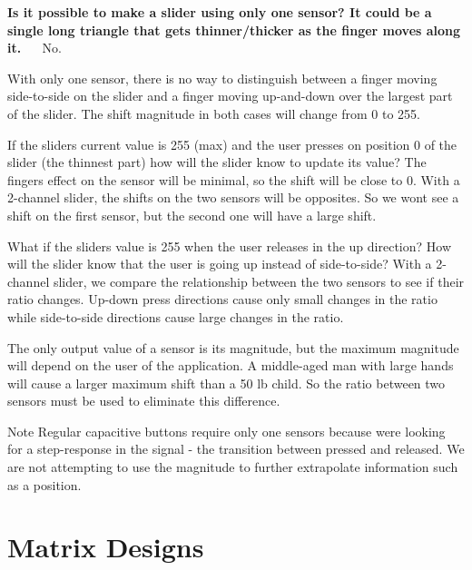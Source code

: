 \begin{DoxyItemize}
\item {\bfseries Is it possible to make a slider using only one sensor? It could be a single long triangle that gets thinner/thicker as the finger moves along it.}~\newline
~\newline
 No. 
\begin{DoxyItemize}
\item With only one sensor, there is no way to distinguish between a finger moving side-\/to-\/side on the slider and a finger moving up-\/and-\/down over the largest part of the slider. The shift magnitude in both cases will change from 0 to 255. 
\item If the slider\textquotesingle{}s current value is 255 (max) and the user presses on position 0 of the slider (the thinnest part) how will the slider know to update its value? The finger\textquotesingle{}s effect on the sensor will be minimal, so the shift will be close to 0. With a 2-\/channel slider, the shifts on the two sensors will be opposites. So we won\textquotesingle{}t see a shift on the first sensor, but the second one will have a large shift. 
\item What if the slider\textquotesingle{}s value is 255 when the user releases in the \textquotesingle{}up\textquotesingle{} direction? How will the slider know that the user is going up instead of side-\/to-\/side? With a 2-\/channel slider, we compare the relationship between the two sensors to see if their ratio changes. Up-\/down press directions cause only small changes in the ratio while side-\/to-\/side directions cause large changes in the ratio. 
\item The only output value of a sensor is its magnitude, but the maximum magnitude will depend on the user of the application. A middle-\/aged man with large hands will cause a larger maximum shift than a 50 lb child. So the ratio between two sensors must be used to eliminate this difference. 
\end{DoxyItemize}\begin{DoxyNote}{Note}
Regular capacitive buttons require only one sensors because we\textquotesingle{}re looking for a step-\/response in the signal -\/ the transition between pressed and released. We are not attempting to use the magnitude to further extrapolate information such as a position. 
\end{DoxyNote}

\end{DoxyItemize}\hypertarget{featMatrix}{}\section{Matrix Designs}\label{featMatrix}
